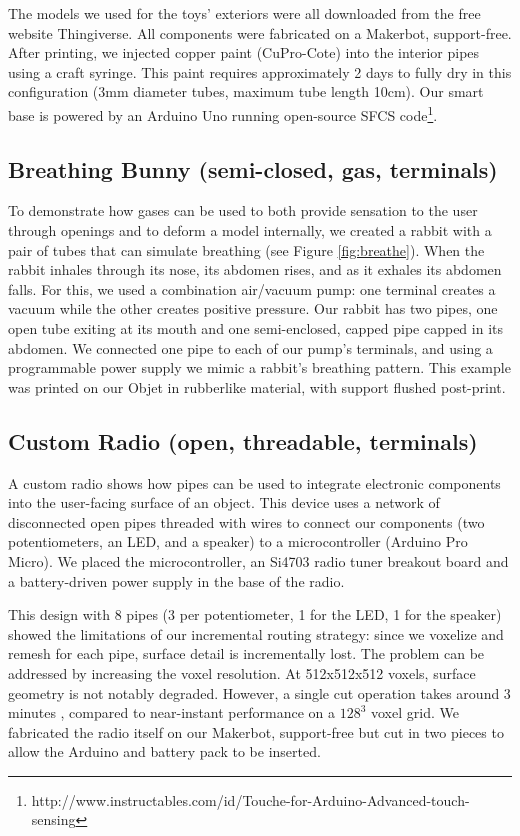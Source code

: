 The models we used for the toys' exteriors were all downloaded from the free website Thingiverse.  All components were fabricated on a Makerbot, support-free.  After printing, we injected copper paint (CuPro-Cote) into the interior pipes using a craft syringe.  This paint requires approximately 2 days to fully dry in this configuration (3mm diameter tubes, maximum tube length 10cm).  Our smart base is powered by an Arduino Uno running open-source SFCS code\footnote{http://www.instructables.com/id/Touche-for-Arduino-Advanced-touch-sensing}.

\subsection{Breathing Bunny (semi-closed, gas, terminals)}

To demonstrate how gases can be used to both provide sensation to the user through openings and to deform a model internally, we created a rabbit with a pair of tubes that can simulate breathing (see Figure \ref{fig:breathe}).  When the rabbit inhales through its nose, its abdomen rises, and as it exhales its abdomen falls.  For this, we used a combination air/vacuum pump: one terminal creates a vacuum while the other creates positive pressure.  Our rabbit has two pipes, one open tube exiting at its mouth and one semi-enclosed, capped pipe capped in its abdomen.  We connected one pipe to each of our pump's terminals, and using a programmable power supply we mimic a rabbit's breathing pattern.  This example was printed on our Objet in rubberlike material, with support flushed post-print.

\subsection{Custom Radio (open, threadable, terminals)}

A custom radio shows how pipes can be used to integrate electronic components into the user-facing surface of an object. This device uses a network of disconnected open pipes threaded with wires to connect our components (two potentiometers, an LED, and a speaker) to a microcontroller (Arduino Pro Micro). We placed the microcontroller, an Si4703 radio tuner breakout board and a battery-driven power supply in the base of the radio. 

This design with 8 pipes (3 per potentiometer, 1 for the LED, 1 for the speaker) showed the limitations of our incremental routing strategy: since we voxelize and remesh for each pipe, surface detail is incrementally lost. The problem can be addressed by increasing the voxel resolution. At 512x512x512 voxels, surface geometry is not notably degraded. However, a single cut operation takes around 3 minutes , compared to near-instant performance on a $128^3$ voxel grid.  We fabricated the radio itself on our Makerbot, support-free but cut in two pieces to allow the Arduino and battery pack to be inserted.

